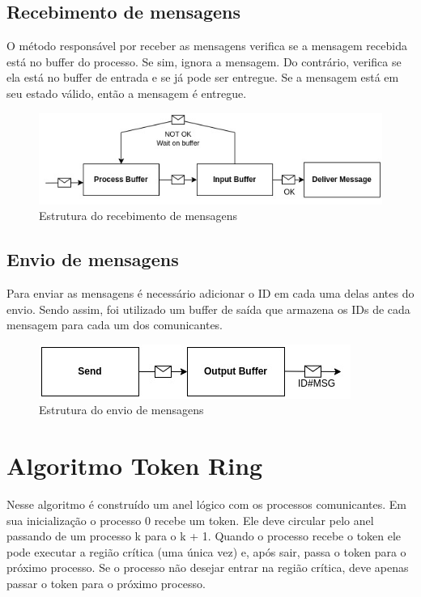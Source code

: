 \documentclass[
	12pt,				%
	openright,			%
	oneside,			%
	a4paper,			%
	english,			%
	french,				%
	spanish,			%
	brazil				%
	]{abntex2}
\begin{document}
\subsection{Recebimento de mensagens}
O método responsável por receber as mensagens verifica se a mensagem recebida
está no buffer do processo. Se sim, ignora a mensagem. Do contrário, verifica se
ela está no buffer de entrada e se já pode ser entregue. Se a mensagem está em seu estado válido,
então a mensagem é entregue.

\begin{figure}[!h]
    \centering
    \includegraphics[scale=0.8]{recv.jpg}
    \caption{Estrutura do recebimento de mensagens}
    \label{fig:recv}
\end{figure}

\subsection{Envio de mensagens}
Para enviar as mensagens é necessário adicionar o ID em cada uma delas antes do envio.
Sendo assim, foi utilizado um buffer de saída que armazena os IDs de cada mensagem para cada um dos
comunicantes.
\begin{figure}[!h]
    \centering
    \includegraphics[scale=0.8]{send.jpg}
    \caption{Estrutura do envio de mensagens}
    \label{fig:send}
\end{figure}

\section{Algoritmo Token Ring}
Nesse algoritmo é construído um anel lógico com os processos comunicantes.
Em sua inicialização o processo 0 recebe um token. Ele deve circular 
pelo anel passando de um processo k para o k + 1. Quando o processo
recebe o token ele pode executar a região crítica (uma única vez) e, após sair,
passa o token para o próximo processo. Se o processo não desejar entrar na 
região crítica, deve apenas passar o token para o próximo processo.
\end{document}
